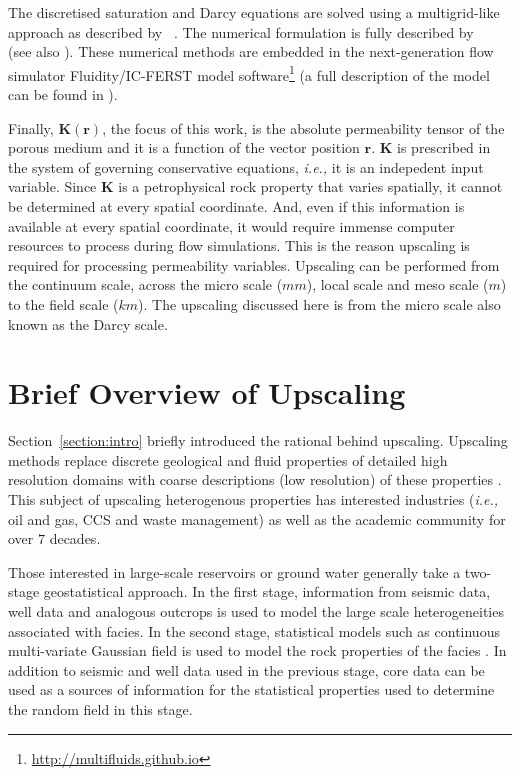 \documentclass[preprint,12pt]{elsarticle}
\newcommand{\ie}{{\it i.e., }}
\begin{document}
\medskip
The discretised saturation and Darcy equations are solved using a multigrid-like approach as described by \citeauthor{pavlidis2016}~\cite{pavlidis2016}. The numerical formulation is fully described by \citeauthor{Gomes_2017}~\cite{Gomes_2017} (see also \cite{salinas2015,adam_2016}). These numerical methods are embedded in the next-generation flow simulator Fluidity/IC-FERST model software\footnote{\href{http://multifluids.github.io}{http://multifluids.github.io}} (a full description of the model can be found in \cite{jackson_2013,Gomes_2017}).


\medskip
Finally, $\mathbf{K}\left(\mathbf{r}\right)$, the focus of this work, is the absolute permeability tensor of the porous medium and it is a function of the vector position $\mathbf{r}$. $\mathbf{K}$ is prescribed in the system of governing conservative equations, \ie it is an indepedent input variable. Since $\mathbf{K}$ is a petrophysical rock property that varies spatially, it cannot be determined at every spatial coordinate. And, even if this information is available at every spatial coordinate, it would require immense computer resources to process during flow simulations. This is the reason upscaling is required for processing permeability variables. Upscaling can be performed from the continuum scale, across the micro scale ($mm$), local scale and meso scale ($m$) to the field scale ($km$)\cite{ECMI_2004}. The upscaling discussed here is from the micro scale also known as the Darcy scale.

\section{Brief Overview of Upscaling}\label{section:overview_upscaling}

Section~\ref{section:intro} briefly introduced the rational behind upscaling. Upscaling methods replace discrete geological and fluid properties of detailed high resolution domains with coarse descriptions (low resolution) of these properties \cite{Vereecken_2007}. This subject of upscaling heterogenous properties has interested industries (\ie oil and gas, CCS and waste management) as well as the academic community for over $7$ decades.

Those interested in large-scale reservoirs or ground water generally take a two-stage geostatistical approach. In the first stage, information from seismic data, well data and analogous outcrops is used to model the large scale heterogeneities associated with facies. In the second stage, statistical models such as continuous multi-variate Gaussian field is used to model the rock properties of the facies \cite{Ewing_1997}. In addition to seismic and well data used in the previous stage, core data can be used as a sources of information for the statistical properties used to determine the random field in this stage.
\end{document}
